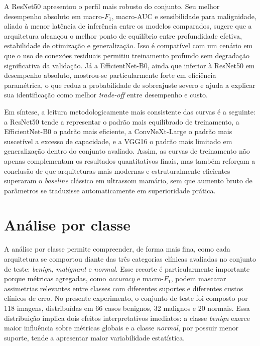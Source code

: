 \documentclass[tcc,capa]{texufpel}
\begin{document}
A ResNet50 apresentou o perfil mais robusto do conjunto. Seu melhor desempenho absoluto em macro-\(F_1\), macro-AUC e sensibilidade para malignidade, aliado à menor latência de inferência entre os modelos comparados, sugere que a arquitetura alcançou o melhor ponto de equilíbrio entre profundidade efetiva, estabilidade de otimização e generalização. Isso é compatível com um cenário em que o uso de conexões residuais permitiu treinamento profundo sem degradação significativa da validação. Já a EfficientNet-B0, ainda que inferior à ResNet50 em desempenho absoluto, mostrou-se particularmente forte em eficiência paramétrica, o que reduz a probabilidade de sobreajuste severo e ajuda a explicar sua identificação como melhor \textit{trade-off} entre desempenho e custo. 

Em síntese, a leitura metodologicamente mais consistente das curvas é a seguinte: a ResNet50 tende a representar o padrão mais equilibrado de treinamento, a EfficientNet-B0 o padrão mais eficiente, a ConvNeXt-Large o padrão mais suscetível a excesso de capacidade, e a VGG16 o padrão mais limitado em generalização dentro do conjunto avaliado. Assim, as curvas de treinamento não apenas complementam os resultados quantitativos finais, mas também reforçam a conclusão de que arquiteturas mais modernas e estruturalmente eficientes superaram o \textit{baseline} clássico em ultrassom mamário, sem que aumento bruto de parâmetros se traduzisse automaticamente em superioridade prática. 

\section{Análise por classe}

A análise por classe permite compreender, de forma mais fina, como cada arquitetura se comportou diante das três categorias clínicas avaliadas no conjunto de teste: \textit{benign}, \textit{malignant} e \textit{normal}. Esse recorte é particularmente importante porque métricas agregadas, como \textit{accuracy} e macro-\(F_1\), podem mascarar assimetrias relevantes entre classes com diferentes suportes e diferentes custos clínicos de erro. No presente experimento, o conjunto de teste foi composto por 118 imagens, distribuídas em 66 casos benignos, 32 malignos e 20 normais. Essa distribuição implica dois efeitos interpretativos imediatos: a classe \textit{benign} exerce maior influência sobre métricas globais e a classe \textit{normal}, por possuir menor suporte, tende a apresentar maior variabilidade estatística.
\end{document}
